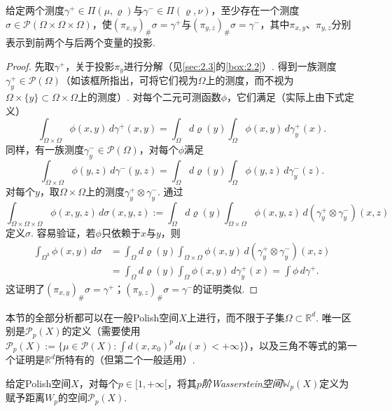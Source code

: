 \begin{lemma}\label{obj:5.5}
给定两个测度$\gamma^+\in\Pi(\mu,\varrho)$与$\gamma^-\in\Pi(\varrho,\nu)$，至少存在一个测度$\sigma\in\mathscr P(\Omega\times\Omega\times\Omega)$，使$(\pi_{x,y})_\#\sigma=\gamma^+$与$(\pi_{y,z})_\#\sigma=\gamma^-$，其中$\pi_{x,y}$、$\pi_{y,z}$分别表示到前两个与后两个变量的投影.
\end{lemma}
\begin{proof}
先取$\gamma^+$，关于投影$\pi_y$进行分解（见\autoref{sec:2.3}的\autoref{box:2.2}）. 得到一族测度$\gamma_y^+\in\mathscr P(\Omega)$（如该框所指出，可将它们视为$\Omega$上的测度，而不视为$\Omega\times\{y\}\subset\Omega\times\Omega$上的测度）. 对每个二元可测函数$\phi$，它们满足（实际上由下式定义）
\[
\int_{\Omega\times\Omega}\phi(x,y)\,d\gamma^+(x,y)
=\int_\Omega d\varrho(y)\int_\Omega\phi(x,y)\,d\gamma_y^+(x).
\]
同样，有一族测度$\gamma_y^-\in\mathscr P(\Omega)$，对每个$\phi$满足
\[
\int_{\Omega\times\Omega}\phi(y,z)\,d\gamma^-(y,z)
=\int_\Omega d\varrho(y)\int_\Omega\phi(y,z)\,d\gamma_y^-(z).
\]
对每个$y$，取$\Omega\times\Omega$上的测度$\gamma_y^+\otimes\gamma_y^-$. 通过
\[
\int_{\Omega\times\Omega\times\Omega}\phi(x,y,z)\,d\sigma(x,y,z)
:=\int_\Omega d\varrho(y)\int_{\Omega\times\Omega}\phi(x,y,z)\,d(\gamma_y^+\otimes\gamma_y^-)(x,z)
\]
定义$\sigma$. 容易验证，若$\phi$只依赖于$x$与$y$，则
\[
\begin{aligned}
\int_{\Omega^3}\phi(x,y)\,d\sigma
&=\int_\Omega d\varrho(y)\int_{\Omega\times\Omega}\phi(x,y)\,d(\gamma_y^+\otimes\gamma_y^-)(x,z)\\
&=\int_\Omega d\varrho(y)\int_\Omega\phi(x,y)\,d\gamma_y^+(x)=\int\phi\,d\gamma^+.
\end{aligned}
\]
这证明了$(\pi_{x,y})_\#\sigma=\gamma^+$；$(\pi_{y,z})_\#\sigma=\gamma^-$的证明类似.
\end{proof}

\begin{remark}\label{obj:5.6}
本节的全部分析都可以在一般Polish空间$X$上进行，而不限于子集$\Omega\subset\mathbb R^d$. 唯一区别是$\mathscr P_p(X)$的定义（需要使用$\mathscr P_p(X):=\{\mu\in\mathscr P(X):\int d(x,x_0)^p\,d\mu(x)<+\infty\}$），以及三角不等式的第一个证明是$\mathbb R^d$所特有的（但第二个一般适用）.
\end{remark}

\begin{definition}\label{obj:5.7}
给定Polish空间$X$，对每个$p\in[1,+\infty[$，将其\emph{$p$阶Wasserstein空间}$\mathbb W_p(X)$定义为赋予距离$W_p$的空间$\mathscr P_p(X)$.
\end{definition}
